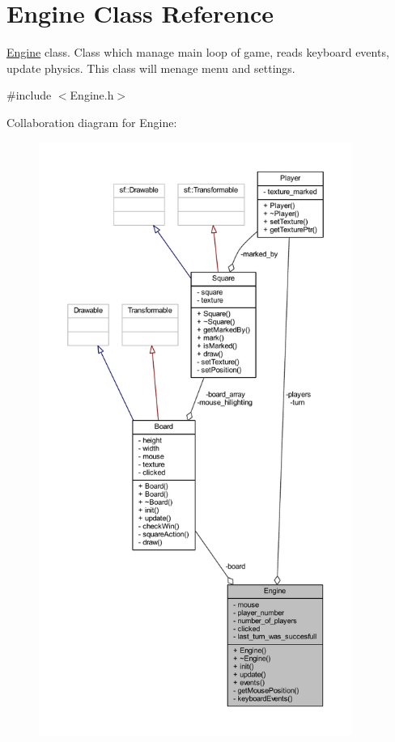 \hypertarget{class_engine}{}\section{Engine Class Reference}
\label{class_engine}


\hyperlink{class_engine}{Engine} class. Class which manage main loop of game, reads keyboard events, update physics. This class will menage menu and settings.  




{\ttfamily \#include $<$Engine.\+h$>$}



Collaboration diagram for Engine\+:
\nopagebreak
\begin{figure}[H]
\begin{center}
\leavevmode
\includegraphics[height=550pt]{class_engine__coll__graph}
\end{center}
\end{figure}
